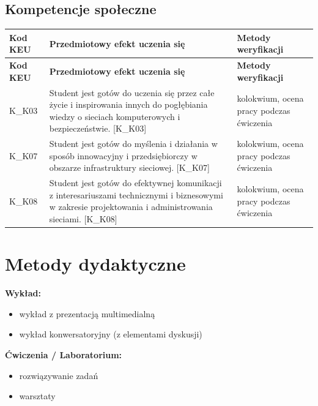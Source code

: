 \documentclass[12pt, a4paper]{article}
\newcommand{\thdrule}{\noalign{\global\setlength{\extrarowheight}{0pt}}}
\newcommand{\thdend}{\noalign{\global\setlength{\extrarowheight}{3pt}}}
\begin{document}
\subsection*{Kompetencje społeczne}
{\scriptsize
\begin{longtable}{m{1.6cm}m{9.0cm}m{4.2cm}}
\thdrule\toprule
\rowcolor{pjatkRed} {\color{white}\footnotesize\textbf{\vphantom{Ag}Kod KEU}} & {\color{white}\footnotesize\textbf{\vphantom{Ag}Przedmiotowy efekt uczenia się}} & {\color{white}\footnotesize\textbf{\vphantom{Ag}Metody weryfikacji}} \\
\midrule\thdend
\endfirsthead
\thdrule\toprule
\rowcolor{pjatkRed} {\color{white}\footnotesize\textbf{\vphantom{Ag}Kod KEU}} & {\color{white}\footnotesize\textbf{\vphantom{Ag}Przedmiotowy efekt uczenia się}} & {\color{white}\footnotesize\textbf{\vphantom{Ag}Metody weryfikacji}} \\
\midrule\thdend
\endhead
  \rowcolor{tableRowLight} K\_K03 & Student jest gotów do uczenia się przez całe życie i inspirowania innych do pogłębiania wiedzy o sieciach komputerowych i bezpieczeństwie. {[}K\_K03{]} & kolokwium, ocena pracy podczas ćwiczenia \\
  \rowcolor{tableRowAlt} K\_K07 & Student jest gotów do myślenia i działania w sposób innowacyjny i przedsiębiorczy w obszarze infrastruktury sieciowej. {[}K\_K07{]} & kolokwium, ocena pracy podczas ćwiczenia \\
  \rowcolor{tableRowLight} K\_K08 & Student jest gotów do efektywnej komunikacji z interesariuszami technicznymi i biznesowymi w zakresie projektowania i administrowania sieciami. {[}K\_K08{]} & kolokwium, ocena pracy podczas ćwiczenia \\
\bottomrule
\end{longtable}}

\section{Metody dydaktyczne}

\textbf{Wykład:}
\begin{itemize}
  \item wykład z prezentacją multimedialną
  \item wykład konwersatoryjny (z elementami dyskusji)
\end{itemize}
\vspace{4pt}
\textbf{Ćwiczenia / Laboratorium:}
\begin{itemize}
  \item rozwiązywanie zadań
  \item warsztaty
\end{itemize}
\vspace{4pt}
\end{document}
